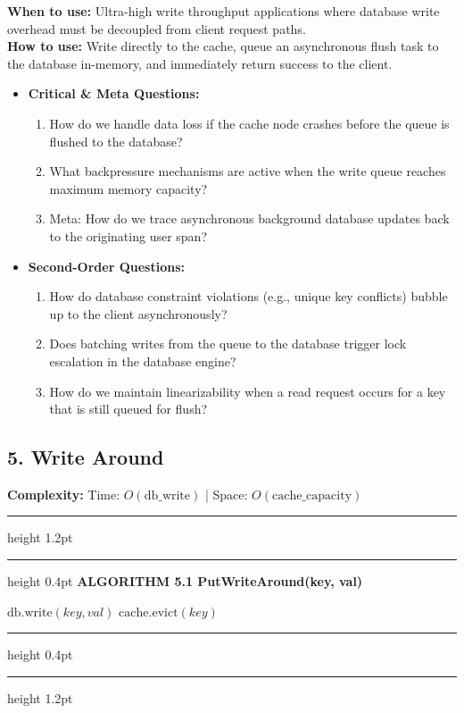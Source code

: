 \documentclass[11pt,a4paper]{article}
\newenvironment{textbookalgo}[2]{%
  \par\addvspace{1.2em}\noindent
  \hrule height 1.2pt
  \vspace{1.5pt}
  \hrule height 0.4pt
  \vspace{5pt}
  {\noindent\large\bfseries\sffamily ALGORITHM #1 \quad #2}
  \par\vspace{5pt}
  \RestyleAlgo{plain}
}{%
  \par\vspace{4pt}
  \hrule height 0.4pt
  \vspace{1.5pt}
  \hrule height 1.2pt
  \par\addvspace{1.2em}
}
\theoremstyle{definition}
\begin{document}
\noindent
\textbf{When to use:} Ultra-high write throughput applications where database write overhead must be decoupled from client request paths.\\
\textbf{How to use:} Write directly to the cache, queue an asynchronous flush task to the database in-memory, and immediately return success to the client.
\begin{itemize}[leftmargin=*]
  \item[] \textbf{Critical \& Meta Questions:}
  \begin{enumerate}
  \item How do we handle data loss if the cache node crashes before the queue is flushed to the database?
  \item What backpressure mechanisms are active when the write queue reaches maximum memory capacity?
  \item Meta: How do we trace asynchronous background database updates back to the originating user span?
  \end{enumerate}
  \item[] \textbf{Second-Order Questions:}
  \begin{enumerate}
  \item How do database constraint violations (e.g., unique key conflicts) bubble up to the client asynchronously?
  \item Does batching writes from the queue to the database trigger lock escalation in the database engine?
  \item How do we maintain linearizability when a read request occurs for a key that is still queued for flush?
  \end{enumerate}
\end{itemize}
\medskip

\clearpage
\subsection{5. Write Around}

\noindent
\textbf{Complexity:} Time: $O(\text{db\_write})$ | Space: $O(\text{cache\_capacity})$
\smallskip

\begin{textbookalgo}{5.1}{PutWriteAround(key, val)}
\begin{algorithm}[H]
$\text{db.write}(key, val)$\;
$\text{cache.evict}(key)$\;
\end{algorithm}
\end{textbookalgo}
\end{document}
